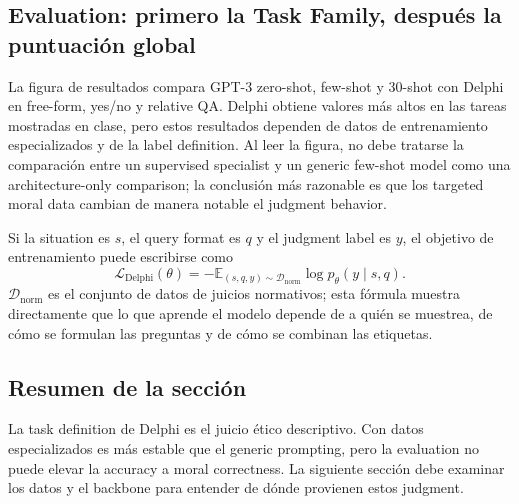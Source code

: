 
\subsection{Evaluation: primero la Task Family, después la puntuación global}

La figura de resultados compara GPT-3 zero-shot, few-shot y 30-shot con Delphi en free-form, yes/no y relative QA. Delphi obtiene valores más altos en las tareas mostradas en clase, pero estos resultados dependen de datos de entrenamiento especializados y de la label definition. Al leer la figura, no debe tratarse la comparación entre un supervised specialist y un generic few-shot model como una architecture-only comparison; la conclusión más razonable es que los targeted moral data cambian de manera notable el judgment behavior.


Si la situation es $s$, el query format es $q$ y el judgment label es $y$, el objetivo de entrenamiento puede escribirse como
\begin{equation}
\mathcal{L}_{\mathrm{Delphi}}(\theta)
=-\mathbb{E}_{(s,q,y)\sim\mathcal{D}_{\mathrm{norm}}}
\log p_{\theta}(y\mid s,q).
\end{equation}
$\mathcal{D}_{\mathrm{norm}}$ es el conjunto de datos de juicios normativos; esta fórmula muestra directamente que lo que aprende el modelo depende de a quién se muestrea, de cómo se formulan las preguntas y de cómo se combinan las etiquetas.

\subsection{Resumen de la sección}

La task definition de Delphi es el juicio ético descriptivo. Con datos especializados es más estable que el generic prompting, pero la evaluation no puede elevar la accuracy a moral correctness. La siguiente sección debe examinar los datos y el backbone para entender de dónde provienen estos judgment.
